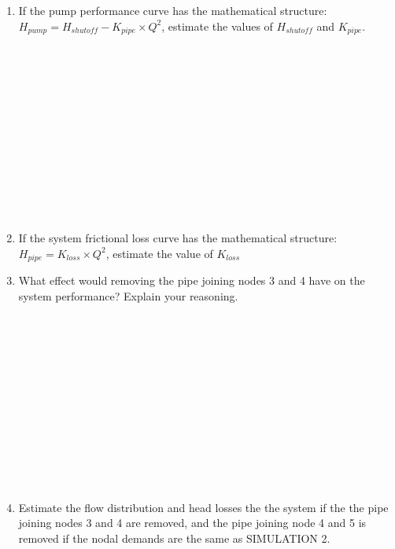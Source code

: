\documentclass[11pt]{article}
\begin{document}
\begin{enumerate}
\begin{enumerate}
\item If the pump performance curve has the mathematical structure: ~\\
$H_{pump} = H_{shutoff} - K_{pipe} \times Q^2$, estimate the values of $H_{shutoff}$  and $K_{pipe}$.
\\
\\
\\
\\
\\
\\
\\
\\
\\
\\
\\
\\
\\
\item If the system frictional loss curve has the mathematical structure:
 $H_{pipe}= K_{loss} \times Q^2$, estimate the value of $K_{loss}$

\clearpage
\item What effect would removing the pipe joining nodes 3 and 4 have on the system performance?   Explain your reasoning.
\\
\\
\\
\\
\\
\\
\\
\\
\\
\\
\\
\\
\\
\item Estimate the flow distribution and head losses the the system if the the pipe joining nodes 3 and 4 are removed, and the pipe joining node 4 and 5 is removed if the nodal demands are the same as SIMULATION  2.
\end{enumerate} 

\begin{figure}[ht!] %
\centering


\end{figure}
\end{enumerate}
\end{document}
